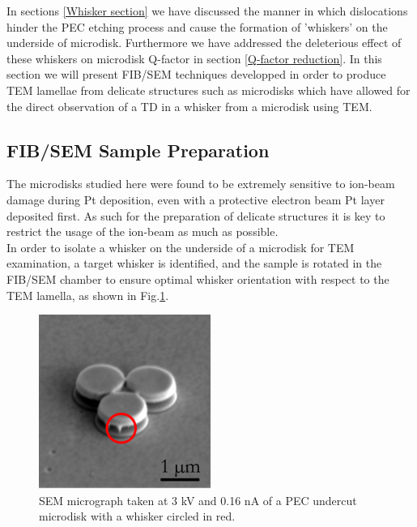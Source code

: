 In sections \ref{Whisker section} we have discussed the manner in which dislocations hinder the PEC etching process and cause the formation of 'whiskers' on the underside of microdisk. Furthermore we have addressed the deleterious effect of these whiskers on microdisk Q-factor in section \ref{Q-factor reduction}. In this section we will present FIB/SEM techniques developped in order to produce TEM lamellae from delicate structures such as microdisks which have allowed for the direct observation of a TD in a whisker from a microdisk using TEM.

\subsection{FIB/SEM Sample Preparation}

The microdisks studied here were found to be extremely sensitive to ion-beam damage during Pt deposition, even with a protective electron beam Pt layer deposited first. As such for the preparation of delicate structures it is key to restrict the usage of the ion-beam as much as possible. \\
In order to isolate a whisker on the underside of a microdisk for TEM examination, a target whisker is identified, and the sample is rotated in the FIB/SEM chamber to ensure optimal whisker orientation with respect to the TEM lamella, as shown in Fig.\ref{FIBwhisk}.

\begin{figure}[h]
	\centering
	\includegraphics[width=0.5\textwidth]{Figs/Ch4/FIBwhisk}
	\caption {SEM micrograph taken at 3 kV and 0.16 nA of a PEC undercut microdisk with a whisker circled in red.}
	\label{FIBwhisk}
\end{figure}
\FloatBarrier 

